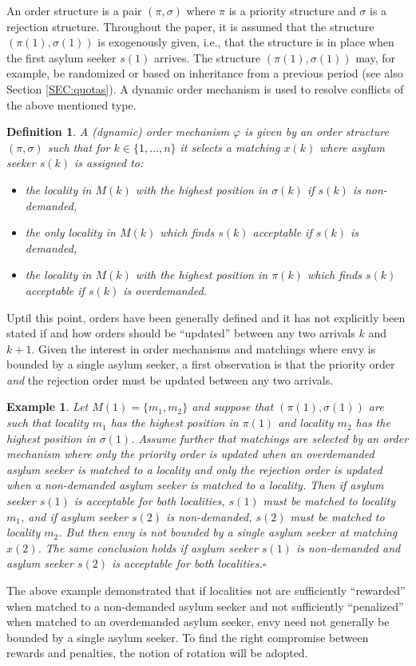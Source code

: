 \documentclass[12pt,fleqn]{article}
\newtheorem{definition}{Definition}
\newtheorem{example}{Example}
\begin{document}
An order structure is a pair $(\pi,\sigma)$ where $\pi$ is a priority structure and $\sigma$ is a rejection structure. Throughout the paper, it is assumed that the structure $(\pi(1),\sigma(1))$ is exogenously given, i.e., that the structure is in place when the first asylum seeker $s(1)$ arrives. The structure $(\pi(1),\sigma(1))$ may, for example, be randomized or based on inheritance from a previous period (see also Section \ref{SEC:quotas}). A dynamic order mechanism is used to resolve conflicts of the above mentioned type.
\begin{definition}\rm\label{DEF:Structure_Mechanism}
A (dynamic) order mechanism $\varphi$ is given by an order structure $(\pi,\sigma)$ such that for $k\in\{1,\ldots,n\}$ it selects a matching $x(k)$ where asylum seeker $s(k)$ is assigned to:
\begin{itemize}
\item[(i)] the locality in $M(k)$ with the highest position in $\sigma(k)$ if $s(k)$ is non-demanded,
\item[(ii)] the only locality in $M(k)$ which finds $s(k)$ acceptable if $s(k)$ is demanded,
\item[(iii)] the locality in $M(k)$ with the highest position in $\pi(k)$ which finds $s(k)$ acceptable if $s(k)$ is overdemanded.
\end{itemize}
\end{definition}
\noindent Uptil this point, orders have been generally defined and it has not explicitly been stated if and how orders should be ``updated'' between any two arrivals $k$ and $k+1$. Given the interest in order mechanisms and matchings where envy is bounded by a single asylum seeker, a first observation is that the priority order \emph{and} the rejection order must be updated between any two arrivals.
\begin{example}\rm
Let $M(1)=\{m_1,m_2\}$ and suppose that $(\pi(1),\sigma(1))$ are such that locality $m_1$ has the highest position in $\pi(1)$ and locality $m_2$ has the highest position in $\sigma(1)$. Assume further that matchings are selected by an order mechanism where \emph{only} the priority order is updated when an overdemanded asylum seeker is matched to a locality and \emph{only} the rejection order is updated when a non-demanded asylum seeker is matched to a locality. Then if asylum seeker $s(1)$ is acceptable for both localities, $s(1)$ must be matched to locality $m_1$, and if asylum seeker $s(2)$ is non-demanded, $s(2)$ must be matched to locality $m_2$. But then envy is not bounded by a single asylum seeker at matching $x(2)$. The same conclusion holds if asylum seeker $s(1)$ is non-demanded and asylum seeker $s(2)$ is acceptable for both localities.\hfill$\square$
\end{example}
\noindent The above example demonstrated that if localities not are sufficiently ``rewarded'' when matched to a non-demanded asylum seeker and not sufficiently ``penalized'' when matched to an overdemanded asylum seeker, envy need not generally be bounded by a single asylum seeker. To find the right compromise between rewards and penalties, the notion of rotation will be adopted.
\end{document}
